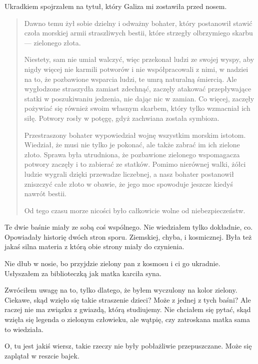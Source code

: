Ukradkiem spojrzałem na tytuł, który Galiza mi zostawiła przed nosem.

\begin{sl}
\begin{quote}
	Dawno temu żył sobie dzielny i odważny bohater, który postanowił stawić czoła morskiej armii straszliwych bestii, które strzegły olbrzymiego skarbu --- zielonego złota.
	
	Niestety, sam nie umiał walczyć, więc przekonał ludzi ze swojej wyspy, aby nigdy więcej nie karmili potworów i nie współpracowali z nimi, w nadziei na to, że pozbawione wsparcia ludzi, te umrą naturalną śmiercią.
	Ale wygłodzone straszydła zamiast zdechnąć, zaczęły atakować przepływające statki w poszukiwaniu jedzenia, nie dając nic w zamian. Co więcej, zaczęły pożywiać się również swoim własnym skarbem, który tylko wzmacniał ich siłę. Potwory rosły w potęgę, gdyż zachwiana została symbioza.
	
	Przestraszony bohater wypowiedział wojnę wszystkim morskim istotom. Wiedział, że musi nie tylko je pokonać, ale także zabrać im ich zielone złoto.
	Sprawa była utrudniona, że pozbawione zielonego wspomagacza potwory zaczęły i to zabierać ze statków.
	Pomimo nierównej walki, żółci ludzie wygrali dzięki przewadze liczebnej, a nasz bohater postanowił zniszczyć całe złoto w obawie, że jego moc spowoduje jeszcze kiedyś nawrót bestii.
	
	Od tego czasu morze nicości było całkowicie wolne od niebezpieczeństw.
\end{quote}
\end{sl}

Te dwie baśnie miały ze sobą coś wspólnego. Nie wiedziałem tylko dokładnie, co. Opowiadały historię dwóch stron sporu. Ziemskiej, chyba, i kosmicznej.
Była też jakaś silna materia z którą obie strony miały do czynienia.

\begin{dialogue}
	\ds{} Nie dłub w nosie, bo przyjdzie zielony pan z kosmosu i ci go ukradnie. \dm{} Usłyszałem za biblioteczką jak matka karciła syna.
\end{dialogue}

Zwróciłem uwagę na to, tylko dlatego, że byłem wyczulony na kolor zielony.
Ciekawe, skąd wzięło się takie straszenie dzieci? Może z jednej z tych baśni? Ale raczej nie ma związku z gwiazdą, którą studiujemy.
Nie chciałem się pytać, skąd wzięła się legenda o zielonym człowieku, ale wątpię, czy zatroskana matka sama to wiedziała.

O, tu jest jakiś wiersz, takie rzeczy nie były pobłażliwie przepuszczane. Może się zaplątał w reszcie bajek.

